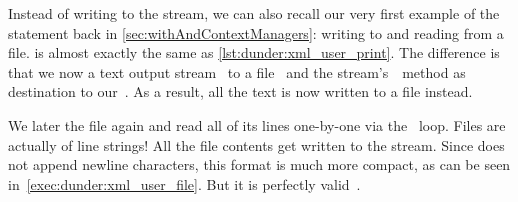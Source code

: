 Instead of writing to the  stream, we can also recall our very first example of the  statement back in \cref{sec:withAndContextManagers}:
writing to and reading from a file.
 is almost exactly the same as \cref{lst:dunder:xml_user_print}.
The difference is that we now  a text output stream~ to a file~ and the stream's~~method as destination to our~.
As a result, all the text is now written to a file instead.

We later  the file again and read all of its lines one-by-one via the~ loop.
Files are actually  of line strings!
All the file contents get written to the  stream.
Since  does not append newline characters, this format is much more compact, as can be seen in~\cref{exec:dunder:xml_user_file}.
But it is perfectly valid~.

